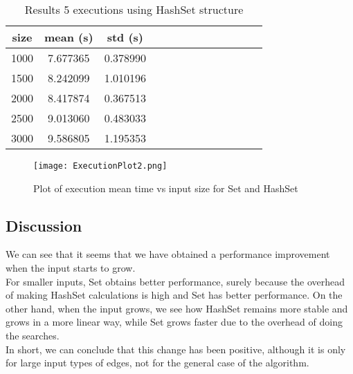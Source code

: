 \begin{table}[H]
    \begin{adjustwidth}{-1in}{-1in} %
    \centering
    \begin{tabular}{|c|c|c|c|c|c|c|c|c|c|c|c|c|}
    \hline
    size & mean (s)& std (s) \\
    \hline
    1000 & 7.677365 & 0.378990 \\
    1500 & 8.242099 & 1.010196 \\
    2000 & 8.417874 & 0.367513 \\
    2500 & 9.013060 & 0.483033 \\
    3000 & 9.586805 & 1.195353 \\
    \hline
    \end{tabular}
    \caption[{[Exp] Table results HashSet structure}]{Results 5 executions using HashSet structure}
    \label{results5}
    \end{adjustwidth}
\end{table}

\begin{figure}[H]
    \centering
    \texttt{[image: ExecutionPlot2.png]}
    \caption[{[Exp] Plot Set vs HashSet}]{Plot of execution mean time vs input size for Set and HashSet}
    \label{fig:results6}
\end{figure}

\subsection*{Discussion}
We can see that it seems that we have obtained a performance improvement when the input starts to grow.\\
For smaller inputs, Set obtains better performance, surely because the overhead of making HashSet calculations is high and Set has better performance.
On the other hand, when the input grows, we see how HashSet remains more stable and grows in a more linear way, while Set grows faster due to the overhead of doing the searches.\\

In short, we can conclude that this change has been positive, although it is only for large input types of edges, not for the general case of the algorithm.